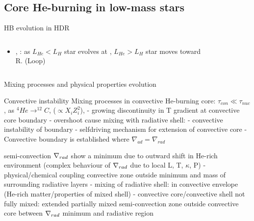 \subsection{Core He-burning in low-mass stars}
\begin{frame}{HB evolution in HDR}
\begin{columns}[T]
\begin{column}{0.5\textwidth}
\begin{itemize}
\item {}, : as $L_{He}<L_H$ star evolves at , $L_{He}>L_H$ star moves toward R. (Loop)
\end{itemize}
\end{column}
\begin{column}{0.5\textwidth}
\begin{figure}[!ht]
\end{figure}
\end{column}
\end{columns}
\end{frame}

\begin{frame}{Mixing processes and physical properties evolution}
\begin{block}{Convective instability}
Mixing processes in convective He-burning core: $\tau_{con}\ll\tau_{nuc}$, as $^4He\to^{12}C$,  ($\propto X_iZ_i^2$), \xaumenta{\nrad{}} - growing discontinuity in T gradient at convective core boundary - overshoot cause mixing with radiative shell: \xaumenta{\kappa} - convective instability of boundary - selfdriving mechanism for extension of convective core - Convective boundary is established where $\nabla_{ad}=\nabla_{rad}$
\end{block}
\begin{block}{semi-convection}
$\nabla_{rad}{}$ show a minimum due to outward shift in He-rich environment (complex behaviour of $\nabla_{rad}$ due to local L, T, $\kappa$, P) - physical/chemical coupling convective zone outside minimum and mass of surrounding radiative layers - mixing of radiative shell: \xdiminuisce{\nad{}} in convective envelope (He-rich matter/properties of mixed shell) - convective core/convective shell not fully mixed: extended partially mixed semi-convection zone outside convective core between $\nabla_{rad}$ minimum and radiative region
\end{block}
\end{frame}

